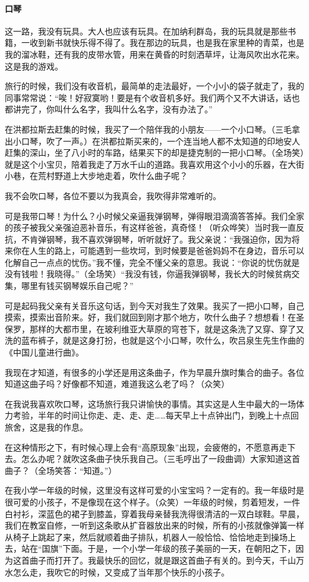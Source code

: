 \paragraph*{口琴}
\par 这一路，我没有玩具。大人也应该有玩具。在加纳利群岛，我的玩具就是那些书籍，一收到新书就快乐得不得了。我在那边的玩具，也是我在家里种的青菜，也是我的溜冰鞋，还有我的皮带水管，用来在黄昏的时刻洒草坪，让海风吹出水花来。这是我的游戏。
\par 旅行的时候，我们没有收音机，最简单的走法最好，一个小小的袋子就走了，我的同事常常说：“唉！好寂寞哟！要是有个收音机多好。我们两个又不大讲话，话也都讲完了，你叫什么名字，我叫什么名字，没有办法了。”
\par 在洪都拉斯去赶集的时候，我买了一个陪伴我的小朋友——一个小口琴。（三毛拿出小口琴，吹了一声。）在洪都拉斯买来的，一个连当地人都不太知道的印地安人赶集的深山，坐了八小时的车路，结果买下的却是捷克制的一把小口琴。（全场笑）就是这个小宝贝，陪着我走了万水千山的道路。我喜欢用这个小小的乐器，在大街小巷，在荒村野道上大步地走着，吹什么曲子呢？
\par 我不会吹口琴，各位不要以为我真会，我吹得非常难听的。
\par 可是我带口琴！为什么？小时候父亲逼我弹钢琴，弹得眼泪滴滴答答掉。我们全家的孩子被我父亲强迫恶补音乐，有这样爸爸，真奇怪！（听众哗笑）当时我一直反抗，不肯弹钢琴，我不喜欢弹钢琴，听听就好了。我父亲说：“我强迫你，因为将来你在人生的路上，可能遇到一些坎坷，到时候要是爸爸妈妈不在身边，音乐可以化解自己一点点的忧伤。”我不懂，完全不懂父亲的意思。我说：“你说的忧伤就是没有钱啦！我晓得。”（全场笑）“我没有钱，你逼我弹钢琴，我长大的时候贫病交集，哪里有钱买钢琴娱乐自己呢？”
\par 可是起码我父亲有关音乐这句话，到今天对我生了效果。我买了一把小口琴，自己摸索，摸索出音阶来。好，我们就回到刚才那个地方，吹什么曲子？想想看！在圣保罗，那样的大都市里，在玻利维亚大草原的穹苍下，就是这条洗了又穿、穿了又洗的蓝布裤子，就是这身打扮，也就是这个小口琴，吹什么，吹吕泉生先生作曲的《中国儿童进行曲》。
\par 我现在才知道，有很多的小学还是用这条曲子，作为早晨升旗时集合的曲子。各位知道这曲子吗？好像都不知道，难道我这么老了吗？（众笑）
\par 在我说我喜欢吹口琴，这场旅行我只讲愉快的事情。其实这是人生中最大的一场体力考验，半年的时间让你走、走、走、走……每天早上十点钟出门，到晚上十点回旅舍，这是我的作息。
\par 在这种情形之下，有时候心理上会有“高原现象”出现，会疲倦的，不愿意再走下去。怎么办呢？就吹这条曲子快乐我自己。（三毛哼出了一段曲调）大家知道这首曲子？（全场笑答：“知道。”）
\par 在我小学一年级的时候，这里没有这样可爱的小宝宝吗？一定有的。我一年级时是很可爱的小孩子，不是像现在这个样子。（众笑）一年级的时候，剪着短发，一件白衬衫，深蓝色的裙子到膝盖，穿着我母亲替我洗得很清洁的一双白球鞋。早晨，我们在教室自修，一听到这条歌从扩音器放出来的时候，所有的小孩就像弹簧一样从椅子上跳起了来，然后就顺着曲子排队，机器人一般恰恰、恰恰地走到操场上去，站在“国旗”下面。于是，一个小学一年级的孩子美丽的一天，在朝阳之下，因为这首曲子而打开了。我最快乐的回忆，就是跟这首曲子有关的。到今天，千山万水怎么走，我吹它的时候，又变成了当年那个快乐的小孩子。
